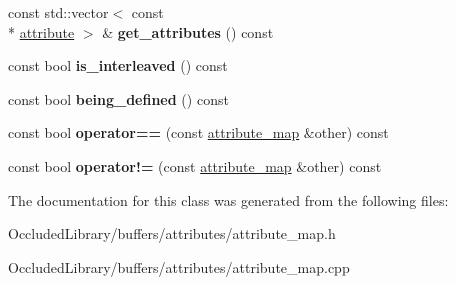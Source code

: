 \begin{DoxyCompactItemize}
\item 
\hypertarget{classoccluded_1_1buffers_1_1attributes_1_1attribute__map_a7c40376c72ad8b85e936213af5abfccf}{const std\+::vector$<$ const \\*
\hyperlink{classoccluded_1_1buffers_1_1attributes_1_1attribute}{attribute} $>$ \& {\bfseries get\+\_\+attributes} () const }\label{classoccluded_1_1buffers_1_1attributes_1_1attribute__map_a7c40376c72ad8b85e936213af5abfccf}

\item 
\hypertarget{classoccluded_1_1buffers_1_1attributes_1_1attribute__map_a378a2e5d7cb0371d45267ef1018f01e0}{const bool {\bfseries is\+\_\+interleaved} () const }\label{classoccluded_1_1buffers_1_1attributes_1_1attribute__map_a378a2e5d7cb0371d45267ef1018f01e0}

\item 
\hypertarget{classoccluded_1_1buffers_1_1attributes_1_1attribute__map_afc2dc57c1bdc2dd5f82a145925243642}{const bool {\bfseries being\+\_\+defined} () const }\label{classoccluded_1_1buffers_1_1attributes_1_1attribute__map_afc2dc57c1bdc2dd5f82a145925243642}

\item 
\hypertarget{classoccluded_1_1buffers_1_1attributes_1_1attribute__map_aa27a4acfbc32c8a9545c2e4aad8fdd12}{const bool {\bfseries operator==} (const \hyperlink{classoccluded_1_1buffers_1_1attributes_1_1attribute__map}{attribute\+\_\+map} \&other) const }\label{classoccluded_1_1buffers_1_1attributes_1_1attribute__map_aa27a4acfbc32c8a9545c2e4aad8fdd12}

\item 
\hypertarget{classoccluded_1_1buffers_1_1attributes_1_1attribute__map_a3bb49b4c1ca9895883d1b76a0431e7d6}{const bool {\bfseries operator!=} (const \hyperlink{classoccluded_1_1buffers_1_1attributes_1_1attribute__map}{attribute\+\_\+map} \&other) const }\label{classoccluded_1_1buffers_1_1attributes_1_1attribute__map_a3bb49b4c1ca9895883d1b76a0431e7d6}

\end{DoxyCompactItemize}


The documentation for this class was generated from the following files\+:\begin{DoxyCompactItemize}
\item 
Occluded\+Library/buffers/attributes/attribute\+\_\+map.\+h\item 
Occluded\+Library/buffers/attributes/attribute\+\_\+map.\+cpp\end{DoxyCompactItemize}
